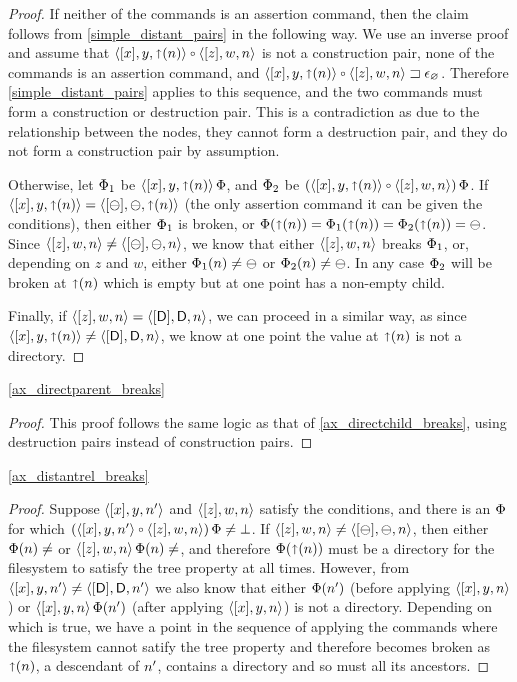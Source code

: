 \begin{proof}
If neither of the commands is an assertion command, then the claim follows from
\cref{simple_distant_pairs} in the following way.
We use an inverse proof and assume that $\cxypnv\cc\czwnv$ is not a construction pair,
none of the commands is an assertion command, and $\wrksx{\cxypnv\cc\czwnv}$.
Therefore \cref{simple_distant_pairs} applies to this sequence, and the two commands
must form a construction or destruction pair. This is a contradiction as due to
the relationship between the nodes, they cannot form a destruction pair, and
they do not form a construction pair by assumption.

Otherwise, let $\Phi_1$ be $\langle{[x],y,\mathord{\shortuparrow}({n})}\rangle\,\Phi$, and $\Phi_2$ be $(\cxypnv\cc\czwnv)\aFS$.
If $\langle{[x],y,\mathord{\shortuparrow}({n})}\rangle=\langle{[\ominus],\ominus,\mathord{\shortuparrow}({n})}\rangle$ (the only assertion command it can be given the conditions),
then either $\Phi_1$ is broken, or
$\Phi(\mathord{\shortuparrow}({n}))=\Phi_1(\mathord{\shortuparrow}({n}))=\Phi_2(\mathord{\shortuparrow}({n}))=\ominus$.
Since $\langle{[z],w,n}\rangle\neq\langle{[\ominus],\ominus,n}\rangle$, we know that either $\langle{[z],w,n}\rangle$ breaks $\Phi_1$,
or, depending on $z$ and $w$, either $\Phi_1(n)\neq\ominus$ or $\Phi_2(n)\neq\ominus$.
In any case $\Phi_2$ will be broken at $\mathord{\shortuparrow}({n})$ which is empty but at one point has a non-empty child.

Finally, if $\langle{[z],w,n}\rangle=\langle{[\mathsf{D}],\mathsf{D},n}\rangle$, we can proceed in a similar way,
as since $\langle{[x],y,\mathord{\shortuparrow}({n})}\rangle\neq\langle{[\mathsf{D}],\mathsf{D},n}\rangle$, we know at one point the value at $\mathord{\shortuparrow}({n})$ is not a directory.
\end{proof}

\cref{ax_directparent_breaks}

\begin{proof}
This proof follows the same logic as that of \cref{ax_directchild_breaks},
using destruction pairs instead of construction pairs.
\end{proof}

\cref{ax_distantrel_breaks}

\begin{proof}
Suppose $\langle{[x],y,n'}\rangle$ and $\langle{[z],w,n}\rangle$ satisfy the conditions,
and there is an $\Phi$ for which $(\cxynnv\cc\czwnv)\aFS\neq\fsbroken$.
If $\langle{[z],w,n}\rangle\neq\langle{[\ominus],\ominus,n}\rangle$, then either $\FS(n)\neq\empty$ or $\czwnv\aFS(n)\neq\empty$,
and therefore $\Phi(\mathord{\shortuparrow}({n}))$ must be a directory for the filesystem to satisfy
the tree property at all times.
However, from $\langle{[x],y,n'}\rangle\neq\langle{[\mathsf{D}],\mathsf{D},n'}\rangle$ we also know that either $\Phi(n')$ 
(before applying $\langle{[x],y,n}\rangle$) or $\langle{[x],y,n}\rangle\,\Phi(n')$ (after applying $\langle{[x],y,n}\rangle$)
is not a directory. Depending on which is true, we have a point in the sequence
of applying the commands where the filesystem cannot satify the tree property
and therefore becomes broken as $\mathord{\shortuparrow}({n})$, a descendant of $n'$, contains
a directory and so must all its ancestors.
\end{proof}


